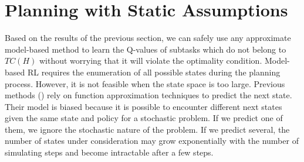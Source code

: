 





\section{Planning with Static Assumptions}
\label{se:Model}

Based on the results of the previous section, we can safely use any approximate model-based method 
to learn the Q-values of subtasks which do not belong to $TC(H)$ without worrying
that it will violate the optimality condition. Model-based RL requires the enumeration of all possible states during the planning process.
However, it is not feasible when the state space is too large.
Previous methods (\cite{ApproxDyna, ApproxTree}) rely on function approximation
techniques to predict the next state. Their model is biased because it is possible 
to encounter different next states given the same state and policy for a stochastic problem. If we 
predict one of them, we ignore the stochastic nature of the problem. If we predict
several, the number of states under consideration may grow exponentially with the number of simulating steps
and become intractable after a few steps.

